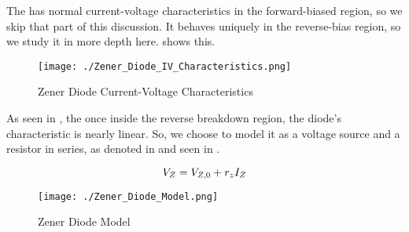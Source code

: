 The  has normal current-voltage characteristics in the forward-biased region, so we skip that part of this discussion.
It behaves uniquely in the reverse-bias region, so we study it in more depth here.
 shows this.

\begin{figure}[h!tbp]
  \centering
  \texttt{[image: ./Zener\_Diode\_IV\_Characteristics.png]}
  \caption{Zener Diode Current-Voltage Characteristics \parencite[p.~203]{sedraTextbook7}}
  \label{fig:Zener_Diode_IV_Characteristics}
\end{figure}

As seen in , the once inside the reverse breakdown region, the diode's characteristic is nearly linear.
So, we choose to model it as a voltage source and a resistor in series, as denoted in  and seen in .

\begin{equation}\label{eq:Zener_Diode_Model}
  V_{Z} = V_{Z,0} + r_{z} I_{Z}
\end{equation}

\begin{figure}[h!tbp]
  \centering
  \texttt{[image: ./Zener\_Diode\_Model.png]}
  \caption{Zener Diode Model \parencite[p.~204]{sedraTextbook7}}
  \label{fig:Zener_Diode_Model}
\end{figure}


